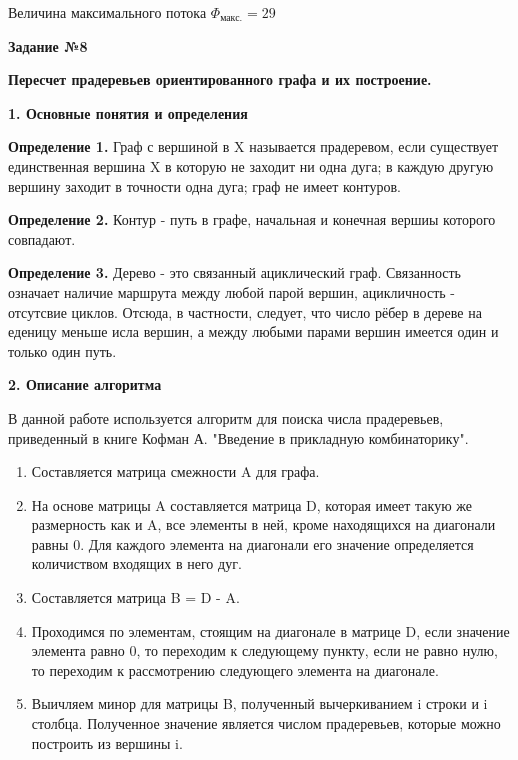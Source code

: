 \documentclass{article}
\begin{document}
\par
Величина максимального потока $\Phi_{\text{макс.}} = 29$
\newpage
\begin{center}
	\textbf{Задание №8}
\end{center}
\begin{center}
	\textbf{Пересчет прадеревьев ориентированного графа и их построение.}
\end{center}
\textbf{1. Основные понятия и определения} 
\begin{flushleft}
\textbf{Определение 1.}  Граф с вершиной в X называется прадеревом, если существует единственная вершина X в которую не заходит ни одна дуга; в каждую другую вершину заходит в точности одна дуга; граф не имеет контуров.
\end{flushleft}
\begin{flushleft}
	\textbf{Определение 2.} Контур - путь в графе, начальная и конечная вершиы которого совпадают.
\end{flushleft}
\begin{flushleft}
	\textbf{Определение 3.} Дерево - это связанный ациклический граф. Связанность означает наличие маршрута между любой парой вершин, ацикличность - отсутсвие циклов. Отсюда, в частности, следует, что число рёбер в дереве на еденицу меньше исла вершин, а между любыми парами вершин имеется один и только один путь.
\end{flushleft}
\textbf{2. Описание алгоритма}
\begin{flushleft}
	В данной работе используется алгоритм для поиска числа прадеревьев, приведенный в книге Кофман А. "Введение в прикладную комбинаторику".
	\begin{enumerate}
		\item Составляется матрица смежности A для графа.
		\item На основе матрицы A составляется матрица D, которая имеет такую же размерность как и A, все элементы в ней, кроме находящихся на диагонали равны 0. Для каждого элемента на диагонали его значение определяется количиством входящих в него дуг.
		\item Составляется матрица B = D - A.
		\item Проходимся по элементам, стоящим на диагонале в матрице D, если значение элемента равно 0, то переходим к следующему пункту, если не равно нулю, то переходим к рассмотрению следующего элемента на диагонале.
		\item Выичляем минор для матрицы B, полученный вычеркиванием i строки и i столбца. Полученное значение является числом прадеревьев, которые можно построить из вершины i.
	\end{enumerate}
\end{flushleft}
\end{document}
